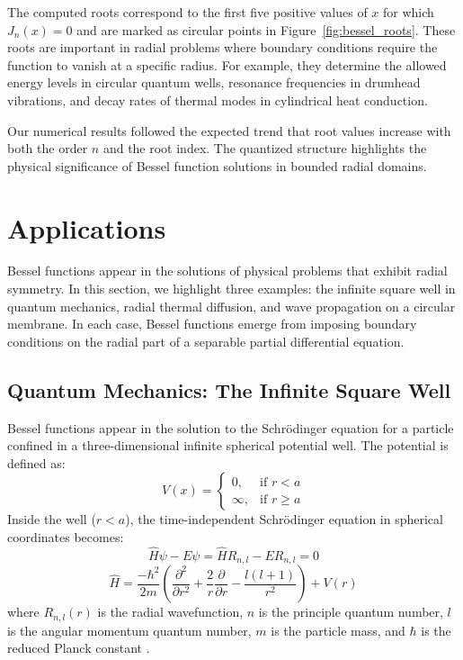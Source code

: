 \documentclass[linenumbers, twocolumn]{aastex631}
\begin{document}
\noindent The computed roots correspond to the first five positive values of $x$
for which $J_n(x)=0$ and are marked as circular points in Figure~\ref{fig:bessel_roots}.
These roots are important in radial problems where boundary conditions require the
function to vanish at a specific radius. For example, they determine the allowed
energy levels in circular quantum wells, resonance frequencies in drumhead 
vibrations, and decay rates of thermal modes in cylindrical heat conduction.

\noindent Our numerical results followed the expected trend that root values
increase with both the order $n$ and the root index. The quantized structure
highlights the physical significance of Bessel function solutions in bounded
radial domains.\\


\section{Applications} \label{sec:applications}

Bessel functions appear in the solutions of physical
problems that exhibit radial symmetry. In this section, we highlight three
examples: the infinite square well in quantum mechanics, radial thermal
diffusion, and wave propagation on a circular membrane. In each case, Bessel
functions emerge from imposing boundary conditions on the radial part of a 
separable partial differential equation.\\

\subsection{Quantum Mechanics: The Infinite Square Well}

Bessel functions appear in the solution to the Schrödinger equation for a
particle confined in a three-dimensional infinite spherical potential well.
The potential is defined as:
\begin{equation}
    V(x)=
    \begin{cases}
        0, &\text{if }r < a\\
        \infty, &\text{if }r\geq a
    \end{cases}
\end{equation}
\noindent Inside the well ($r < a$), the time-independent Schrödinger equation in
spherical coordinates becomes:
\begin{equation}
    \hat{H}\psi-E\psi=\hat{H}R_{n,l}-ER_{n,l}=0
\end{equation}
\begin{equation}
    \hat{H}=\frac{-\hbar ^2}{2m}\left(\frac{\partial^2}{\partial r^2} + \frac{2}{r} \frac{\partial}{\partial r} - \frac{l(l+1)}{r^2}\right) +V(r)
\end{equation}
\noindent where $R_{n,l}(r)$ is the radial wavefunction, $n$ is the principle
quantum number, $l$ is the angular momentum quantum number, $m$ is the
particle mass, and $\hbar$ is the reduced Planck constant \citet{hanson}.
\end{document}
